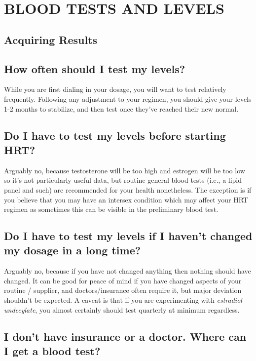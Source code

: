 \documentclass{article}
\begin{document}
 

\section{BLOOD TESTS AND LEVELS}

\subsection*{Acquiring Results}

\subsection{How often should I test my levels?}

While you are first dialing in your dosage, you will want to test relatively frequently. Following any adjustment to your regimen, you should give your levels 1-2 months to stabilize, and then test once they've reached their new normal.

\subsection{Do I have to test my levels before starting HRT?}

Arguably no, because testosterone will be too high and estrogen will be too low so it’s not particularly useful data, but routine general blood tests (i.e., a lipid panel and such) are recommended for your health nonetheless. The exception is if you believe that you may have an intersex condition which may affect your HRT regimen as sometimes this can be visible in the preliminary blood test.

\subsection{Do I have to test my levels if I haven’t changed my dosage in a long time?}

Arguably no, because if you have not changed anything then nothing should have changed. It can be good for peace of mind if you have changed aspects of your routine / supplier, and doctors/insurance often require it, but major deviation shouldn’t be expected. A caveat is that if you are experimenting with \textit{estradiol undecylate}, you almost certainly should test quarterly at minimum regardless.

\subsection{I don’t have insurance or a doctor. Where can I get a blood test?}
\end{document}
